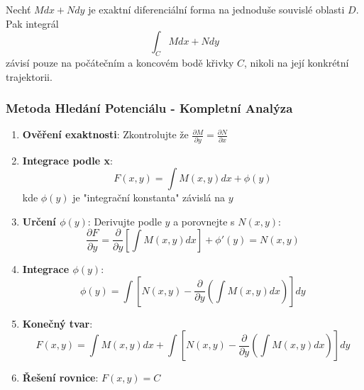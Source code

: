 \vspace{0.6\baselineskip}

\begin{theorem}
Nechť $M dx + N dy$ je exaktní diferenciální forma na jednoduše souvislé oblasti $D$. Pak integrál
\[
\int_C M dx + N dy
\]
závisí pouze na počátečním a koncovém bodě křivky $C$, nikoli na její konkrétní trajektorii.
\end{theorem}

\vspace{0.8\baselineskip}

\subsubsection{Metoda Hledání Potenciálu - Kompletní Analýza}
\label{subsubsec:metoda-hledani-potencialu}

\begin{method}
\label{met:primaintegrace-potencial}
\begin{enumerate}
\item \textbf{Ověření exaktnosti}: Zkontrolujte že $\frac{\partial M}{\partial y} = \frac{\partial N}{\partial x}$

\item \textbf{Integrace podle x}:
\[
F(x, y) = \int M(x, y)dx + \phi(y)
\]
kde $\phi(y)$ je "integrační konstanta" závislá na $y$

\item \textbf{Určení $\phi(y)$}: Derivujte podle $y$ a porovnejte s $N(x, y)$:
\[
\frac{\partial F}{\partial y} = \frac{\partial}{\partial y}\left[\int M(x, y)dx\right] + \phi'(y) = N(x, y)
\]

\item \textbf{Integrace $\phi(y)$}:
\[
\phi(y) = \int \left[N(x, y) - \frac{\partial}{\partial y}\left(\int M(x, y)dx\right)\right] dy
\]

\item \textbf{Konečný tvar}:
\[
F(x, y) = \int M(x, y)dx + \int \left[N(x, y) - \frac{\partial}{\partial y}\left(\int M(x, y)dx\right)\right] dy
\]

\item \textbf{Řešení rovnice}: $F(x, y) = C$
\end{enumerate}
\end{method}

\vspace{0.8\baselineskip}

